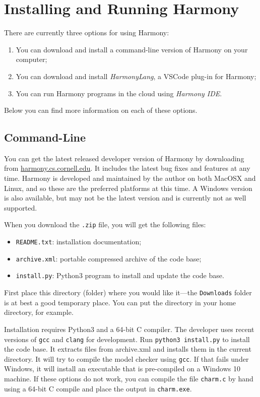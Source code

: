 \documentclass{report}
\begin{document}
\chapter{Installing and Running Harmony}\label{app:install}

There are currently three options for using Harmony:

\begin{enumerate}
\item You can download and install a command-line version of Harmony on your
computer;
\item You can download and install \emph{HarmonyLang}, a VSCode plug-in for Harmony;
\item You can run Harmony programs in the cloud using \emph{Harmony IDE}.
\end{enumerate}

Below you can find more information on each of these options.

\section{Command-Line}

You can get the latest released developer version of Harmony by
downloading from \url{harmony.cs.cornell.edu}.  It includes the latest
bug fixes and features at any time.  Harmony is developed and maintained
by the author on both MacOSX and Linux, and so these are the preferred
platforms at this time.  A Windows version is also available, but may not
be the latest version and is currently not as well supported.

When you download the \texttt{.zip} file, you will get the following
files:

\begin{itemize}
\item \texttt{README.txt}: installation documentation;
\item \texttt{archive.xml}: portable compressed archive of the code base;
\item \texttt{install.py}: Python3 program to install and update the code base.
\end{itemize}

First place this directory (folder) where you would like it---the
\texttt{Downloads} folder is at best a good temporary place.  You can put
the directory in your home directory, for example.

Installation requires Python3 and a 64-bit C compiler.  The developer uses
recent versions of \texttt{gcc} and \texttt{clang} for development.
Run \texttt{python3 install.py} to install the code base.
It extracts files from archive.xml and installs them in the current
directory.
It will try to compile the model checker using \texttt{gcc}.
If that fails under Windows, it will install an executable that
is pre-compiled on a Windows 10 machine.  If these options do not work,
you can compile the file \texttt{charm.c} by hand using a 64-bit C
compile and place the output in \texttt{charm.exe}.
\end{document}

